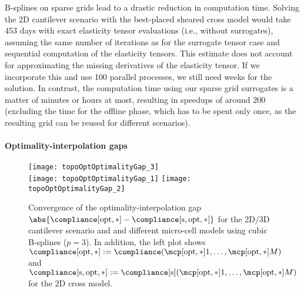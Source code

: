 B-splines on sparse grids lead to a drastic reduction in computation time.
Solving the 2D cantilever scenario with the best-placed sheared cross model
would take 453 days with
exact elasticity tensor evaluations (i.e., without surrogates),
assuming the same number of iterations as for the surrogate tensor case
and sequential computation of the elasticity tensors.
This estimate does not account for approximating the missing derivatives
of the elasticity tensor.
If we incorporate this and use 100 parallel processes,
we still need weeks for the solution.
In contrast, the computation time using our sparse grid surrogates
is a matter of minutes or hours at most,
resulting in speedups of around 200
(excluding the time for the offline phase,
which has to be spent only once, as the resulting grid
can be reused for different scenarios).

\paragraph{Optimality-interpolation gaps}

\begin{figure}
  \texttt{[image: topoOptOptimalityGap\_3]}%
  \\[2mm]%
  \texttt{[image: topoOptOptimalityGap\_1]}%
  \hfill%
  \texttt{[image: topoOptOptimalityGap\_2]}%
  \caption[Convergence of the optimality-interpolation gap]{%
    Convergence of the optimality-interpolation gap
    $\abs{\compliance[\opt,\ast] - \complianceintp[\opt,\ast]}$
    for the 2D/3D cantilever scenario and
    and different micro-cell models using cubic B-splines ($p = 3$).
    In addition, the left plot shows
    $\compliance[\opt,\ast]
    := \compliance(\mcpoptappr{1}, \dotsc, \mcpoptappr{M})$ and
    $\complianceintp[\opt,\ast]
    := \complianceintp(\mcpoptappr{1}, \dotsc, \mcpoptappr{M})$
    for the 2D cross model.%
  }%
  \label{fig:topoOptOptimalityGap}%
\end{figure}

